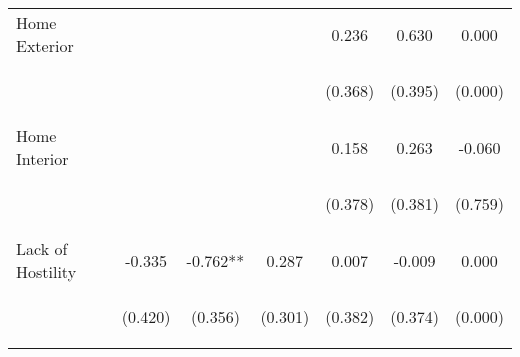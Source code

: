 \begin{tabular}{lcccccc}
\noalign{\smallskip}Home Exterior &  &  &  & 0.236 & 0.630 & 0.000\\
 & \begin{footnotesize}\end{footnotesize} & \begin{footnotesize}\end{footnotesize} & \begin{footnotesize}\end{footnotesize} & \begin{footnotesize}(0.368)\end{footnotesize} & \begin{footnotesize}(0.395)\end{footnotesize} & \begin{footnotesize}(0.000)\end{footnotesize}\\
\noalign{\smallskip}Home Interior &  &  &  & 0.158 & 0.263 & -0.060\\
 & \begin{footnotesize}\end{footnotesize} & \begin{footnotesize}\end{footnotesize} & \begin{footnotesize}\end{footnotesize} & \begin{footnotesize}(0.378)\end{footnotesize} & \begin{footnotesize}(0.381)\end{footnotesize} & \begin{footnotesize}(0.759)\end{footnotesize}\\
\noalign{\smallskip}Lack of Hostility & -0.335 & -0.762** & 0.287 & 0.007 & -0.009 & 0.000\\
 & \begin{footnotesize}(0.420)\end{footnotesize} & \begin{footnotesize}(0.356)\end{footnotesize} & \begin{footnotesize}(0.301)\end{footnotesize} & \begin{footnotesize}(0.382)\end{footnotesize} & \begin{footnotesize}(0.374)\end{footnotesize} & \begin{footnotesize}(0.000)\end{footnotesize}\\

\end{tabular}

